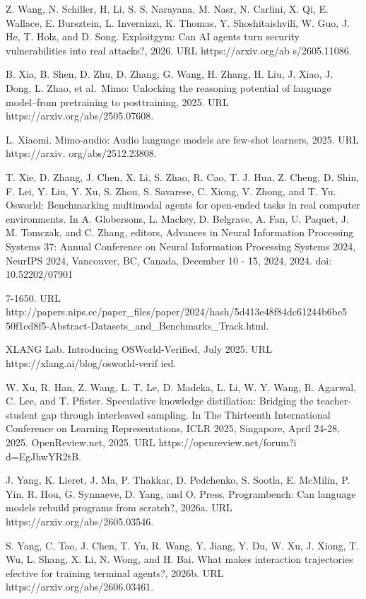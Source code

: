 \documentclass[
  10
]{article}
\begin{document}
Z. Wang, N. Schiller, H. Li, S. S. Narayana, M. Nasr, N. Carlini, X. Qi,
E. Wallace, E. Bursztein, L. Invernizzi, K. Thomas, Y. Shoshitaishvili,
W. Guo, J. He, T. Holz, and D. Song. Exploitgym: Can AI agents turn
security vulnerabilities into real attacks?, 2026. URL
https://arxiv.org/ab s/2605.11086.

B. Xia, B. Shen, D. Zhu, D. Zhang, G. Wang, H. Zhang, H. Liu, J. Xiao,
J. Dong, L. Zhao, et al.~Mimo: Unlocking the reasoning potential of
language model--from pretraining to posttraining, 2025. URL
https://arxiv.org/abs/2505.07608.

L. Xiaomi. Mimo-audio: Audio language models are few-shot learners,
2025. URL https://arxiv. org/abs/2512.23808.

T. Xie, D. Zhang, J. Chen, X. Li, S. Zhao, R. Cao, T. J. Hua, Z. Cheng,
D. Shin, F. Lei, Y. Liu, Y. Xu, S. Zhou, S. Savarese, C. Xiong, V.
Zhong, and T. Yu. Osworld: Benchmarking multimodal agents for open-ended
tasks in real computer environments. In A. Globersons, L. Mackey, D.
Belgrave, A. Fan, U. Paquet, J. M. Tomczak, and C. Zhang, editors,
Advances in Neural Information Processing Systems 37: Annual Conference
on Neural Information Processing Systems 2024, NeurIPS 2024, Vancouver,
BC, Canada, December 10 - 15, 2024, 2024. doi: 10.52202/07901

7-1650. URL
http://papers.nips.cc/paper\_files/paper/2024/hash/5d413e48f84dc61244b6be5
50f1cd8f5-Abstract-Datasets\_and\_Benchmarks\_Track.html.

XLANG Lab. Introducing OSWorld-Verified, July 2025. URL
https://xlang.ai/blog/osworld-verif ied.

W. Xu, R. Han, Z. Wang, L. T. Le, D. Madeka, L. Li, W. Y. Wang, R.
Agarwal, C. Lee, and T. Pfister. Speculative knowledge distillation:
Bridging the teacher-student gap through interleaved sampling. In The
Thirteenth International Conference on Learning Representations, ICLR
2025, Singapore, April 24-28, 2025. OpenReview.net, 2025. URL
https://openreview.net/forum?i d=EgJhwYR2tB.

J. Yang, K. Lieret, J. Ma, P. Thakkar, D. Pedchenko, S. Sootla, E.
McMilin, P. Yin, R. Hou, G. Synnaeve, D. Yang, and O. Press.
Programbench: Can language models rebuild programs from scratch?, 2026a.
URL https://arxiv.org/abs/2605.03546.

S. Yang, C. Tao, J. Chen, T. Yu, R. Wang, Y. Jiang, Y. Du, W. Xu, J.
Xiong, T. Wu, L. Shang, X. Li, N. Wong, and H. Bai. What makes
interaction trajectories efective for training terminal agents?, 2026b.
URL https://arxiv.org/abs/2606.03461.
\end{document}
